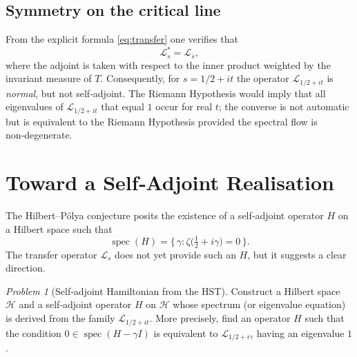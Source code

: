 \documentclass[11pt,a4paper]{article}
\theoremstyle{remark}
\newtheorem{problem}[theorem]{Problem}
\begin{document}
\subsection{Symmetry on the critical line}
From the explicit formula \eqref{eq:transfer} one verifies that
\[
\mathcal{L}_s^* = \mathcal{L}_{\overline{s}} ,
\]
where the adjoint is taken with respect to the inner product weighted by the invariant measure of \(T\). Consequently, for \(s=1/2+it\) the operator \(\mathcal{L}_{1/2+it}\) is \emph{normal}, but not self‑adjoint. The Riemann Hypothesis would imply that all eigenvalues of \(\mathcal{L}_{1/2+it}\) that equal \(1\) occur for real \(t\); the converse is not automatic but is equivalent to the Riemann Hypothesis provided the spectral flow is non‑degenerate.

\section{Toward a Self‑Adjoint Realisation}

The Hilbert–Pólya conjecture posits the existence of a self‑adjoint operator \(H\) on a Hilbert space such that
\[
\operatorname{spec}(H)=\{\,\gamma : \zeta\bigl(\tfrac12+i\gamma\bigr)=0\,\}.
\]
The transfer operator \(\mathcal{L}_s\) does not yet provide such an \(H\), but it suggests a clear direction.

\begin{problem}[Self‑adjoint Hamiltonian from the HST]\label{prob:HP}
Construct a Hilbert space \(\mathscr{H}\) and a self‑adjoint operator \(H\) on \(\mathscr{H}\) whose spectrum (or eigenvalue equation) is derived from the family \(\mathcal{L}_{1/2+it}\). More precisely, find an operator \(H\) such that the condition \(0\in\operatorname{spec}(H-\gamma I)\) is equivalent to \(\mathcal{L}_{1/2+i\gamma}\) having an eigenvalue \(1\).
\end{problem}
\end{document}

